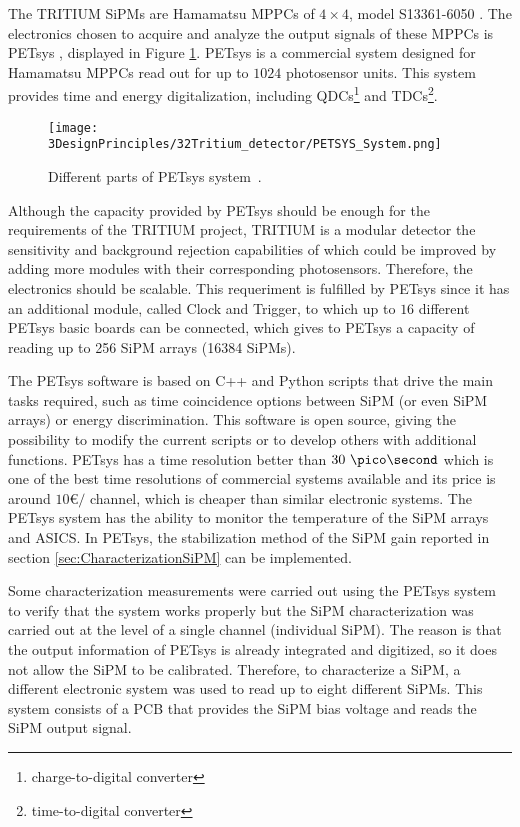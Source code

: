 The TRITIUM SiPMs are Hamamatsu MPPCs of $4\times 4$, model S13361-6050 \cite{DataSheetHammamatsu_16_SiPM_50}. The electronics chosen to acquire and analyze the output signals of these MPPCs is PETsys \cite{PETSYS}, displayed in Figure \ref{fig:PETSYS}. PETsys is a commercial system designed for Hamamatsu MPPCs read out for up to $1024$ photosensor units. This system provides time and energy digitalization, including QDCs\footnote{charge-to-digital converter} and TDCs\footnote{time-to-digital converter}. 

\begin{figure}[h]
\centering
\texttt{[image: 3DesignPrinciples/32Tritium\_detector/PETSYS\_System.png]}
\caption{Different parts of PETsys system\label{fig:PETSYS}~\cite{PETSYS}.}
\end{figure}
Although the capacity provided by PETsys should be enough for the requirements of the TRITIUM project, TRITIUM is a modular detector the sensitivity and background rejection capabilities of which could be improved by adding more modules with their corresponding photosensors. Therefore, the electronics should be scalable. This requeriment is fulfilled by PETsys since it has an additional module, called Clock and Trigger, to which up to $16$ different PETsys basic boards can be connected, which gives to PETsys a capacity of reading up to 256 SiPM arrays (16384 SiPMs). 

The PETsys software is based on C++ and Python scripts that drive the main tasks required, such as time coincidence options between SiPM (or even SiPM arrays) or energy discrimination. This software is open source, giving the possibility to modify the current scripts or to develop others with additional functions. PETsys has a time resolution better than $30~\pico\second$ which is one of the best time resolutions of commercial systems available and its price is around $10$\euro$/$ channel, which is cheaper than similar electronic systems. The PETsys system has the ability to monitor the temperature of the SiPM arrays and ASICS. In PETsys, the stabilization method of the SiPM gain reported in section \ref{sec:CharacterizationSiPM} can be implemented.

Some characterization measurements were carried out using the PETsys system to verify that the system works properly but the SiPM characterization was carried out at the level of a single channel (individual SiPM). The reason is that the output information of PETsys is already integrated and digitized, so it does not allow the SiPM to be calibrated. Therefore, to characterize a SiPM, a different electronic system was used to read up to eight different SiPMs. This system consists of a PCB that provides the SiPM bias voltage and reads the SiPM output signal. 

